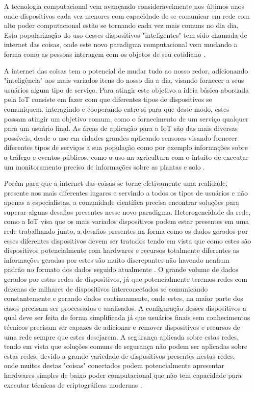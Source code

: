 \documentclass[tid,table]{texufpel} %
\begin{document}
A tecnologia computacional vem avançando consideravelmente nos últimos anos onde dispositivos cada vez menores com capacidade de se comunicar em rede com alto poder computacional estão se tornando cada vez mais comuns no dia dia. Esta popularização do uso desses dispositivos "inteligentes" tem sido chamada de internet das coisas, onde este novo paradigma computacional vem mudando a forma como as pessoas interagem com os objetos de seu cotidiano \cite{xavier2016smart}.

A internet das coisas tem o potencial de mudar tudo ao nosso redor, adicionando "inteligência" aos mais variados itens do nosso dia a dia, visando  fornecer a seus usuários algum tipo de serviço. Para atingir este objetivo a ideia básica abordada pela IoT consiste em fazer com que diferentes tipos de dispositivos se comuniquem, interagindo e cooperando entre si para que deste modo, estes possam atingir um objetivo comum, como o fornecimento de um serviço qualquer para um usuário final. As áreas de aplicação para a IoT são das mais diversas possíveis, desde o uso em cidades grandes aplicando sensores visando fornecer diferentes tipos de serviços a sua população como por exemplo informações sobre o tráfego e eventos públicos, como o uso na agricultura com o intuito de executar um monitoramento preciso de  informações sobre as plantas e solo \cite{gonccalves2017research}.

Porém para que a internet das coisas se torne efetivamente uma realidade, presente nos mais diferentes lugares e servindo a todos os tipos de usuários e não apenas a especialistas, a comunidade científica precisa encontrar soluções para superar alguns desafios presentes nesse novo paradigma. Heterogeneidade da rede, como a IoT visa que os mais variados dispositivos podem estar presentes em uma rede trabalhando junto, a desafios presentes na forma como os dados gerados por esses diferentes dispositivos devem ser tratados tendo em vista que como estes são dispositivos potencialmente com hardwares e recursos totalmente diferentes as informações geradas por estes são muito discrepantes não havendo nenhum padrão no formato dos dados seguido atualmente \cite{agrawal2013survey}. O grande volume de dados gerados por estas redes de dispositivos, já que potencialmente teremos redes com dezenas de milhares de dispositivos interconectados se comunicando constantemente e gerando dados continuamente, onde estes, na maior parte dos casos precisam ser processados e analisados. A configuração desses dispositivos a qual deve ser feita de forma simplificada já que usuários finais sem conhecimentos técnicos precisam ser capazes de adicionar e remover dispositivos e recursos de uma rede sempre que estes desejarem. A segurança aplicada sobre estas redes, tendo em vista que soluções comuns de segurança não podem ser aplicadas sobre estas redes,  devido a grande variedade de dispositivos presentes nestas redes, onde muitos destas "coisas" conectados podem potencialmente apresentar hardwares simples de baixo poder computacional que não tem capacidade para executar técnicas de criptográficas modernas \cite{agrawal2013survey}.
\end{document}
